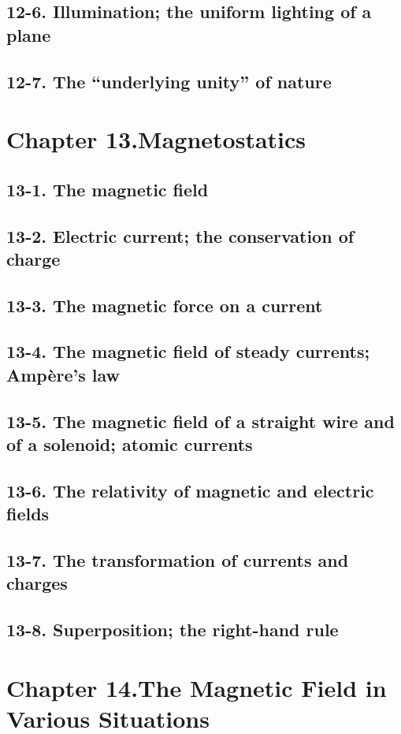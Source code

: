 \documentclass{article}
\begin{document}
\subsection{12-6. Illumination; the uniform lighting of a plane}
\subsection{12-7. The “underlying unity” of nature}
\section{Chapter 13.Magnetostatics}
\subsection{13-1. The magnetic field}
\subsection{13-2. Electric current; the conservation of charge}
\subsection{13-3. The magnetic force on a current}
\subsection{13-4. The magnetic field of steady currents; Ampère’s law}
\subsection{13-5. The magnetic field of a straight wire and of a solenoid; atomic currents}
\subsection{13-6. The relativity of magnetic and electric fields}
\subsection{13-7. The transformation of currents and charges}
\subsection{13-8. Superposition; the right-hand rule}
\section{Chapter 14.The Magnetic Field in Various Situations}
\end{document}
